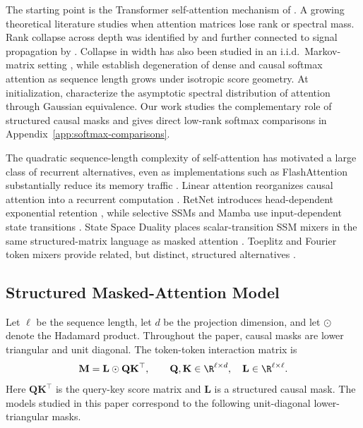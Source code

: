 \documentclass{article}
\newcommand{\hadamard}{\mathbin{\odot}}
\newcommand{\bM}{\mathbf{M}}
\newcommand{\bL}{\mathbf{L}}
\newcommand{\bQ}{\mathbf{Q}}
\newcommand{\bK}{\mathbf{K}}
\theoremstyle{definition}
\theoremstyle{remark}
\begin{document}
The starting point is the Transformer self-attention mechanism of
\citet{vaswani:2017attention}.  A growing theoretical literature studies when
attention matrices lose rank or spectral mass.  Rank collapse across depth was
identified by \citet{attention_is_not_depth} and further connected to signal
propagation by \citet{anagnostidis2022signal}.  Collapse in width has also been
studied in an i.i.d.\ Markov-matrix setting \citep{mindthegap_width}, 
while \citet{li:2026spectral} establish degeneration of dense and causal
softmax attention as sequence length grows under isotropic score geometry.
At initialization, \citet{hayase2026gaussian} characterize the asymptotic
spectral distribution of attention through Gaussian equivalence.  Our work
studies the complementary role of structured causal masks and gives direct
low-rank softmax comparisons in Appendix~\ref{app:softmax-comparisons}.

The quadratic sequence-length complexity of self-attention has motivated a
large class of recurrent alternatives, even as implementations such as
FlashAttention substantially reduce its memory traffic \citep{flashattention}.
Linear attention reorganizes causal attention into a recurrent computation
\citep{linear_attn}.  RetNet introduces head-dependent exponential retention
\citep{sun:2023retentive}, while selective SSMs and Mamba use input-dependent
state transitions \citep{mamba1,mamba2}.  State Space Duality places
scalar-transition SSM mixers in the same structured-matrix language as masked
attention \citep{mamba2}.  Toeplitz and Fourier token mixers provide related,
but distinct, structured alternatives \citep{qin:2023toeplitz,leethorp:2022fnet}.

\subsection{Structured Masked-Attention Model}

Let $\ell$ be the sequence length, let $d$ be the projection dimension, and let
$\hadamard$ denote the Hadamard product.  Throughout the paper, causal masks
are lower triangular and unit diagonal.  The token-token interaction matrix is
\begin{equation}
    \bM=\bL\hadamard \bQ\bK^\top,\qquad
    \bQ,\bK\in\R^{\ell\times d},\quad
    \bL\in\R^{\ell\times \ell}.
    \label{eq:model}
\end{equation}
Here $\bQ\bK^\top$ is the query-key score matrix and $\bL$ is a structured
causal mask.  The models studied in this paper correspond to the following
unit-diagonal lower-triangular masks.
\end{document}
